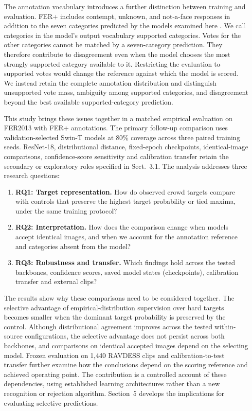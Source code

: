 The annotation vocabulary introduces a further distinction between training and evaluation. FER+ includes contempt, unknown, and not-a-face responses in addition to the seven categories predicted by the models examined here \cite{barsoum2016ferplus}. We call categories in the model's output vocabulary supported categories. Votes for the other categories cannot be matched by a seven-category prediction. They therefore contribute to disagreement even when the model chooses the most strongly supported category available to it. Restricting the evaluation to supported votes would change the reference against which the model is scored. We instead retain the complete annotation distribution and distinguish unsupported vote mass, ambiguity among supported categories, and disagreement beyond the best available supported-category prediction.

This study brings these issues together in a matched empirical evaluation on FER2013 with FER+ annotations. The primary follow-up comparison uses validation-selected Swin-T models at 80\% coverage across three paired training seeds. ResNet-18, distributional distance, fixed-epoch checkpoints, identical-image comparisons, confidence-score sensitivity and calibration transfer retain the secondary or exploratory roles specified in Sect.~3.1. The analysis addresses three research questions:
\begin{enumerate}
\item \textbf{RQ1: Target representation.} How do observed crowd targets compare with controls that preserve the highest target probability or tied maxima, under the same training protocol?
\item \textbf{RQ2: Interpretation.} How does the comparison change when models accept identical images, and when we account for the annotation reference and categories absent from the model?
\item \textbf{RQ3: Robustness and transfer.} Which findings hold across the tested backbones, confidence scores, saved model states (checkpoints), calibration transfer and external clips?
\end{enumerate}

The results show why these comparisons need to be considered together. The selective advantage of empirical-distribution supervision over hard targets becomes smaller when the dominant target probability is preserved by the control. Although distributional agreement improves across the tested within-source configurations, the selective advantage does not persist across both backbones, and comparisons on identical accepted images depend on the selecting model. Frozen evaluation on 1,440 RAVDESS clips \cite{livingstone2018ravdess} and calibration-to-test transfer further examine how the conclusions depend on the scoring reference and achieved operating point. The contribution is a controlled account of these dependencies, using established learning architectures rather than a new recognition or rejection algorithm. Section~5 develops the implications for evaluating selective predictions.

